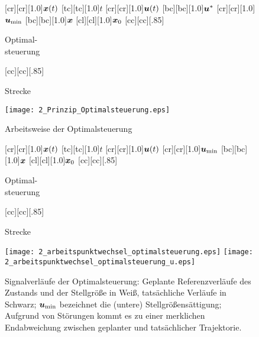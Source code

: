 \begin{figure}[h]
\newcommand{\smallsize}{.85}
	[cr][cr][1.0]{$\boldsymbol{x}(t)$}
	[tc][tc][1.0]{$t$}
	[cr][cr][1.0]{$\boldsymbol{u}(t)$}
	[bc][bc][1.0]{$\boldsymbol{u}^\ast$}
	[cr][cr][1.0]{$\boldsymbol{u}_{\min}$}
	[bc][bc][1.0]{$\boldsymbol{x}$}
	[cl][cl][1.0]{$\boldsymbol{x}_0$}
	[cc][cc][\smallsize]{\parbox[c]{7cm}{\begin{center}Optimal-\\ steuerung \end{center}}}
	[cc][cc][\smallsize]{\parbox[c]{7cm}{\begin{center}Strecke \end{center}}}
	\centering
		\texttt{[image: 2\_Prinzip\_Optimalsteuerung.eps]} \\
  	\caption[Arbeitsweise der Optimalsteuerung]{Arbeitsweise der Optimalsteuerung \cite{foellingeroptimal}}
    \label{fig:arbeitspunktwechsel_optimalsteuerung_prinzip}
\end{figure} 
%
\begin{figure}[h]
\newcommand{\smallsize}{.85}
	[cr][cr][1.0]{$\boldsymbol{x}(t)$}
	[tc][tc][1.0]{$t$}
	[cr][cr][1.0]{$\boldsymbol{u}(t)$}
	[cr][cr][1.0]{$\boldsymbol{u}_{\min}$}
	[bc][bc][1.0]{$\boldsymbol{x}$}
	[cl][cl][1.0]{$\boldsymbol{x}_0$}
	[cc][cc][\smallsize]{\parbox[c]{7cm}{\begin{center}Optimal-\\ steuerung \end{center}}}
	[cc][cc][\smallsize]{\parbox[c]{7cm}{\begin{center}Strecke \end{center}}}
	\centering
  	\texttt{[image: 2\_arbeitspunktwechsel\_optimalsteuerung.eps]}
	\hspace{.5cm}
		\texttt{[image: 2\_arbeitspunktwechsel\_optimalsteuerung\_u.eps]}
  	\caption[Signalverläufe der Optimalsteuerung]{Signalverläufe der Optimalsteuerung: Geplante Referenzverläufe des Zustands und der Stellgröße in Weiß, tatsächliche Verläufe in Schwarz; $\boldsymbol{u}_{\min}$ bezeichnet die (untere) Stellgrößensättigung; Aufgrund von Störungen kommt es zu einer merklichen Endabweichung zwischen geplanter und tatsächlicher Trajektorie.}
    \label{fig:arbeitspunktwechsel_optimalsteuerung}
\end{figure} 

